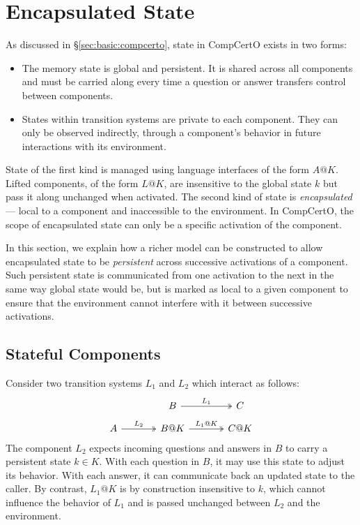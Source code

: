 \documentclass[acmsmall,screen,review,anonymous]{acmart}
\begin{document}


\section{Encapsulated State} \label{sec:encap} %


As discussed in \S\ref{sec:basic:compcerto},
state in CompCertO exists in two forms:
\begin{itemize}
  \item The memory state is global and persistent.
    It is shared across all components
    and must be carried along
    every time a question or answer transfers control
    between components.
  \item States within transition systems
    are private to each component.
    They can only be observed indirectly,
    through a component's behavior
    in future interactions with its environment.
\end{itemize}
State of the first kind
is managed using language interfaces
of the form $A@K$.
Lifted components, of the form $L@K$,
are insensitive to the global state $k$
but pass it along unchanged
when activated.
The second kind of state is \emph{encapsulated}---%
local to a component
and inaccessible to the environment.
In CompCertO, the scope of encapsulated state
can only be a specific activation of the component.

In this section,
we explain how a richer model can be constructed
to allow encapsulated state
to be \emph{persistent} across
successive activations of a component.
Such persistent state
is communicated from one activation to the next
in the same way global state would be,
but is marked as local to a given component
to ensure that the environment cannot interfere
with it between successive activations.


\subsection{Stateful Components} %

Consider two transition systems $L_1$ and $L_2$
which interact as follows:
\[
  \begin{tikzcd}[row sep=small, column sep=large]
    & B \ar[r, twoheadrightarrow, "L_1"] & C \\
    A \ar[r, twoheadrightarrow, "L_2"] &
    B@K \ar[r, twoheadrightarrow, "L_1@K"] &
    C@K
  \end{tikzcd}
\]
The component $L_2$ expects
incoming questions and answers in $B$
to carry a persistent state $k \in K$.
With each question in $B$,
it may use this state to adjust its behavior.
With each answer,
it can communicate back an updated state to the caller.
By contrast,
$L_1@K$ is by construction insensitive to $k$,
which cannot influence the behavior of $L_1$
and is passed unchanged
between $L_2$ and the environment.
\end{document}

